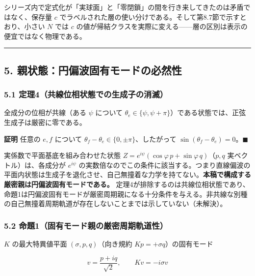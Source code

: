 \documentclass[
  a4paper,
]{ltjsarticle}
\begin{document}
シリーズ内で定式化が「実球面」と「零閉鎖」の間を行き来してきたのは矛盾ではなく、保存量
\(c\)
でラベルされた層の使い分けである。そして第8.7節で示すとおり、小さい
\(N\) では \(c\)
の値が帰結クラスを実際に変える------層の区別は表示の便宜ではなく物理である。

\begin{center}\rule{0.5\linewidth}{0.5pt}\end{center}

\subsection{5.
親状態：円偏波固有モードの必然性}\label{ux89aaux72b6ux614bux5186ux504fux6ce2ux56faux6709ux30e2ux30fcux30c9ux306eux5fc5ux7136ux6027}

\subsubsection{5.1
定理4（共線位相状態での生成子の消滅）}\label{ux5b9aux74064ux5171ux7ddaux4f4dux76f8ux72b6ux614bux3067ux306eux751fux6210ux5b50ux306eux6d88ux6ec5}

全成分の位相が共線（ある \(\psi\) について
\(\theta_e\in\{\psi,\psi+\pi\}\)）である状態では、正弦生成子は厳密に零である。

\textbf{証明} 任意の \(e,f\) について
\(\theta_f-\theta_e\in\{0,\pm\pi\}\)、したがって
\(\sin(\theta_f-\theta_e)=0\)。\(\blacksquare\)

実係数で平面基底を組み合わせた状態
\(Z=e^{i\psi}(\cos\varphi\,p+\sin\varphi\,q)\)（\(p,q\)
実ベクトル）は、各成分が \(e^{i\psi}\)
の実数倍なのでこの条件に該当する。つまり直線偏波の平面内状態は生成子を退化させ、自己無撞着な力学を持てない。\textbf{本稿で構成する厳密親は円偏波固有モードである。}
定理4が排除するのは共線位相状態であり、命題1は円偏波固有モードが厳密周期親になる十分条件を与える。非共線な別種の自己無撞着周期軌道が存在しないことまでは示していない（未解決）。

\subsubsection{5.2
命題1（固有モード親の厳密周期軌道性）}\label{ux547dux984c1ux56faux6709ux30e2ux30fcux30c9ux89aaux306eux53b3ux5bc6ux5468ux671fux8eccux9053ux6027}

\(K\) の最大特異値平面 \((\sigma,p,q)\)（向き規約
\(Kp=+\sigma q\)）の固有モード

\[
v=\frac{p+iq}{\sqrt2},
\qquad
Kv=-i\sigma v
\]
\end{document}
